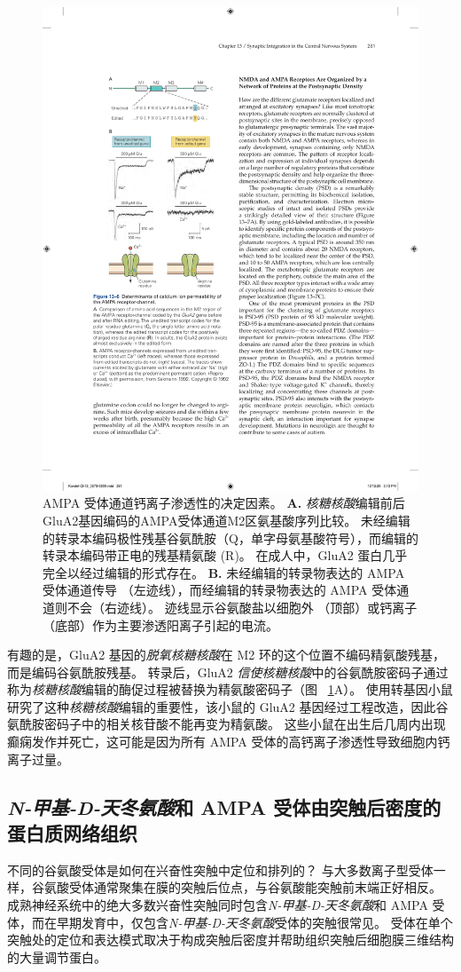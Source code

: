 \begin{figure}[htbp]
	\centering
	\includegraphics[width=0.45\linewidth]{chap13/fig_13_6}
	\caption{AMPA 受体通道钙离子渗透性的决定因素。
		\textbf{A.} \textit{核糖核酸}编辑前后GluA2基因编码的AMPA受体通道M2区氨基酸序列比较。
		未经编辑的转录本编码极性残基谷氨酰胺（Q，单字母氨基酸符号），而编辑的转录本编码带正电的残基精氨酸 (R)。
		在成人中，GluA2 蛋白几乎完全以经过编辑的形式存在。
		\textbf{B.} 未经编辑的转录物表达的 AMPA 受体通道传导 （左迹线），而经编辑的转录物表达的 AMPA 受体通道则不会（右迹线）。
		迹线显示谷氨酸盐以细胞外 （顶部）或钙离子（底部）作为主要渗透阳离子引起的电流\cite{sakmann1992nobel}。}
	\label{fig:13_6}
\end{figure}


有趣的是，GluA2 基因的\textit{脱氧核糖核酸}在 M2 环的这个位置不编码精氨酸残基，而是编码谷氨酰胺残基。
转录后，GluA2 \textit{信使核糖核酸}中的谷氨酰胺密码子通过称为\textit{核糖核酸}编辑的酶促过程被替换为精氨酸密码子（图 ~\ref{fig:13_6}A）。
使用转基因小鼠研究了这种\textit{核糖核酸}编辑的重要性，该小鼠的 GluA2 基因经过工程改造，因此谷氨酰胺密码子中的相关核苷酸不能再变为精氨酸。
这些小鼠在出生后几周内出现癫痫发作并死亡，这可能是因为所有 AMPA 受体的高钙离子渗透性导致细胞内钙离子过量。



\subsection{\textit{N-甲基-D-天冬氨酸}和 AMPA 受体由突触后密度的蛋白质网络组织}

不同的谷氨酸受体是如何在兴奋性突触中定位和排列的？ 
与大多数离子型受体一样，谷氨酸受体通常聚集在膜的突触后位点，与谷氨酸能突触前末端正好相反。
成熟神经系统中的绝大多数兴奋性突触同时包含\textit{N-甲基-D-天冬氨酸}和 AMPA 受体，而在早期发育中，仅包含\textit{N-甲基-D-天冬氨酸}受体的突触很常见。
受体在单个突触处的定位和表达模式取决于构成突触后密度并帮助组织突触后细胞膜三维结构的大量调节蛋白。


